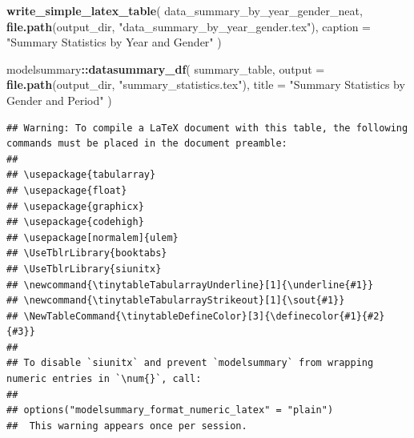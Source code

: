 \documentclass[
]{article}
\newenvironment{Shaded}{\begin{snugshade}}{\end{snugshade}}
\newcommand{\AttributeTok}[1]{\textcolor[rgb]{0.13,0.29,0.53}{#1}}
\newcommand{\FunctionTok}[1]{\textcolor[rgb]{0.13,0.29,0.53}{\textbf{#1}}}
\newcommand{\NormalTok}[1]{#1}
\newcommand{\SpecialCharTok}[1]{\textcolor[rgb]{0.81,0.36,0.00}{\textbf{#1}}}
\newcommand{\StringTok}[1]{\textcolor[rgb]{0.31,0.60,0.02}{#1}}
\newcommand{\tinytableTabularrayUnderline}[1]{\underline{#1}}
\newcommand{\tinytableTabularrayStrikeout}[1]{\sout{#1}}
\begin{document}
\begin{Shaded}
\begin{Highlighting}[]
\FunctionTok{write\_simple\_latex\_table}\NormalTok{(}
\NormalTok{    data\_summary\_by\_year\_gender\_neat,}
    \FunctionTok{file.path}\NormalTok{(output\_dir, }\StringTok{"data\_summary\_by\_year\_gender.tex"}\NormalTok{),}
    \AttributeTok{caption =} \StringTok{"Summary Statistics by Year and Gender"}
\NormalTok{)}


\NormalTok{modelsummary}\SpecialCharTok{::}\FunctionTok{datasummary\_df}\NormalTok{(}
\NormalTok{    summary\_table,}
    \AttributeTok{output =} \FunctionTok{file.path}\NormalTok{(output\_dir, }\StringTok{"summary\_statistics.tex"}\NormalTok{),}
    \AttributeTok{title =} \StringTok{"Summary Statistics by Gender and Period"}
\NormalTok{)}
\end{Highlighting}
\end{Shaded}

\begin{verbatim}
## Warning: To compile a LaTeX document with this table, the following commands must be placed in the document preamble:
## 
## \usepackage{tabularray}
## \usepackage{float}
## \usepackage{graphicx}
## \usepackage{codehigh}
## \usepackage[normalem]{ulem}
## \UseTblrLibrary{booktabs}
## \UseTblrLibrary{siunitx}
## \newcommand{\tinytableTabularrayUnderline}[1]{\underline{#1}}
## \newcommand{\tinytableTabularrayStrikeout}[1]{\sout{#1}}
## \NewTableCommand{\tinytableDefineColor}[3]{\definecolor{#1}{#2}{#3}}
## 
## To disable `siunitx` and prevent `modelsummary` from wrapping numeric entries in `\num{}`, call:
## 
## options("modelsummary_format_numeric_latex" = "plain")
##  This warning appears once per session.
\end{verbatim}
\end{document}
